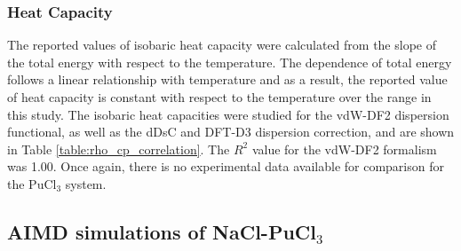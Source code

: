 \documentclass[review]{elsarticle}
\begin{document}
\subsubsection{Heat Capacity}
The reported values of isobaric heat capacity were calculated from the slope of the total energy with respect to the temperature. The dependence of total energy follows a linear relationship with temperature and as a result, the reported value of heat capacity is constant with respect to the temperature over the range in this study. The isobaric heat capacities were studied for the vdW-DF2 dispersion functional, as well as the dDsC and DFT-D3 dispersion correction, and are shown in Table \ref{table:rho_cp_correlation}. The $R^2$ value for the vdW-DF2 formalism was 1.00. Once again, there is no experimental data available for comparison for the PuCl$_3$ system. 

\subsection{AIMD simulations of NaCl-PuCl$_3$}
\end{document}
